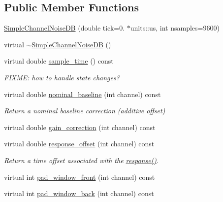 \subsection*{Public Member Functions}
\begin{DoxyCompactItemize}
\item 
\hyperlink{class_wire_cell_1_1_sig_proc_1_1_simple_channel_noise_d_b_af86bbcf1a79a98850b9ca24a0e9bd2e3}{Simple\+Channel\+Noise\+DB} (double tick=0. $\ast$units\+::us, int nsamples=9600)
\item 
virtual \hyperlink{class_wire_cell_1_1_sig_proc_1_1_simple_channel_noise_d_b_ae81f9ee2d711c72b272fadcb5d702979}{$\sim$\+Simple\+Channel\+Noise\+DB} ()
\item 
virtual double \hyperlink{class_wire_cell_1_1_sig_proc_1_1_simple_channel_noise_d_b_ac4ef81b15ca1bf55585bd89a092b8693}{sample\+\_\+time} () const
\begin{DoxyCompactList}\small\item\em F\+I\+X\+ME\+: how to handle state changes? \end{DoxyCompactList}\item 
virtual double \hyperlink{class_wire_cell_1_1_sig_proc_1_1_simple_channel_noise_d_b_ae5b0390412d61c8fab8514ddd8358fa1}{nominal\+\_\+baseline} (int channel) const
\begin{DoxyCompactList}\small\item\em Return a nominal baseline correction (additive offset) \end{DoxyCompactList}\item 
virtual double \hyperlink{class_wire_cell_1_1_sig_proc_1_1_simple_channel_noise_d_b_a7b4f5283401aa1668adda46ba52b06c6}{gain\+\_\+correction} (int channel) const
\item 
virtual double \hyperlink{class_wire_cell_1_1_sig_proc_1_1_simple_channel_noise_d_b_a089731ed6979ee7a3d5029dc6c104902}{response\+\_\+offset} (int channel) const
\begin{DoxyCompactList}\small\item\em Return a time offset associated with the \hyperlink{class_wire_cell_1_1_sig_proc_1_1_simple_channel_noise_d_b_ac86433de014502928205161b6ea93ba0}{response()}. \end{DoxyCompactList}\item 
virtual int \hyperlink{class_wire_cell_1_1_sig_proc_1_1_simple_channel_noise_d_b_a5c1e58cf0586ac32c1e6d3810606a992}{pad\+\_\+window\+\_\+front} (int channel) const
\item 
virtual int \hyperlink{class_wire_cell_1_1_sig_proc_1_1_simple_channel_noise_d_b_a4643919d65336ba0090213d772bb6bf9}{pad\+\_\+window\+\_\+back} (int channel) const

\end{DoxyCompactItemize}

